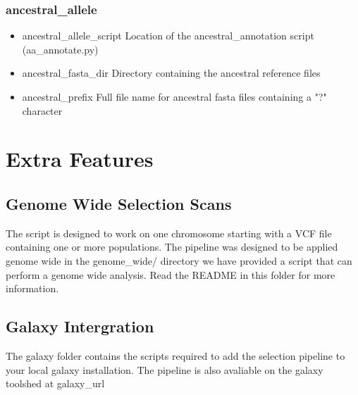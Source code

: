 \documentclass[a4paper,10pt]{article}
\begin{document}
\subsubsection{ancestral\_allele}
\begin{itemize}
\item ancestral\_allele\_script
Location of the ancestral\_annotation script (aa\_annotate.py)
\item ancestral\_fasta\_dir 
Directory containing the ancestral reference files
\item ancestral\_prefix 
Full file name for ancestral fasta files containing a "?" character
\end{itemize}
\section{Extra Features}

\subsection{Genome Wide Selection Scans}
The script is designed to work on one chromosome starting with a VCF file containing one or more populations. The pipeline was designed to be applied genome wide in the genome\_wide/ directory we have provided a script that can perform a genome wide analysis. Read the README in this folder for more information.
\subsection{Galaxy Intergration}
The galaxy folder contains the scripts required to add the selection pipeline to your local galaxy installation. The pipeline is also avaliable on the galaxy toolshed at galaxy\_url




\end{document}
